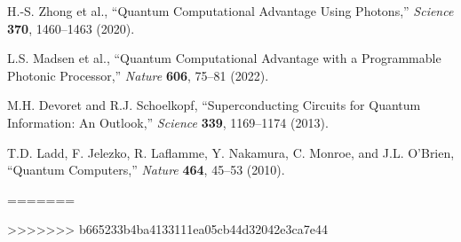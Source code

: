 \documentclass[11pt]{article}
\theoremstyle{plain}
\theoremstyle{definition}
\theoremstyle{remark}
\begin{document}
\begin{thebibliography}{99}
 H.-S. Zhong et al., ``Quantum Computational Advantage Using Photons,'' \emph{Science} \textbf{370}, 1460--1463 (2020).

 L.S. Madsen et al., ``Quantum Computational Advantage with a Programmable Photonic Processor,'' \emph{Nature} \textbf{606}, 75--81 (2022).

 M.H. Devoret and R.J. Schoelkopf, ``Superconducting Circuits for Quantum Information: An Outlook,'' \emph{Science} \textbf{339}, 1169--1174 (2013).

 T.D. Ladd, F. Jelezko, R. Laflamme, Y. Nakamura, C. Monroe, and J.L. O'Brien, ``Quantum Computers,'' \emph{Nature} \textbf{464}, 45--53 (2010).

\end{thebibliography}
=======

>>>>>>> b665233b4ba4133111ea05cb44d32042e3ca7e44
\end{document}
